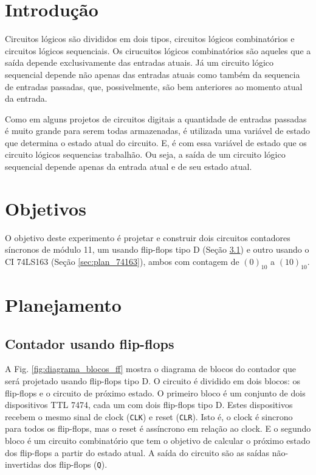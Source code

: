 \documentclass[a4,12pt]{horizon-theme}
\begin{document}
\horizonCover

\horizonTitle


\section{Introdução} %

Circuitos lógicos são divididos em dois tipos, circuitos lógicos combinatórios e circuitos lógicos sequenciais. Os cirucuitos lógicos combinatórios são aqueles que a saída depende exclusivamente das entradas atuais. Já um circuito lógico sequencial depende não apenas das entradas atuais como também da sequencia de entradas passadas, que, possivelmente, são bem anteriores ao momento atual da entrada.

Como em alguns projetos de circuitos digitais a quantidade de entradas passadas é muito grande para serem todas armazenadas, é utilizada uma variável de estado que determina o estado atual do circuito. E, é com essa variável de estado que os circuito lógicos sequencias trabalhão. Ou seja, a saída de um circuito lógico sequencial depende apenas da entrada atual e de seu estado atual.

\section{Objetivos} %
O objetivo deste experimento é projetar e construir dois circuitos contadores síncronos de módulo 11, um usando flip-flops tipo D (Seção \ref{sec:plan_ff}) e outro usando o CI 74LS163 (Seção \ref{sec:plan_74163}), ambos com contagem de $(0)_{10}$ a $(10)_{10}$.


\section{Planejamento} %
\label{sec:plan}

\subsection{Contador usando flip-flops}
\label{sec:plan_ff}

A Fig. \ref{fig:diagrama_blocos_ff} mostra o diagrama de blocos do contador que será projetado usando flip-flops tipo D. O circuito é dividido em dois blocos: os flip-flops e o circuito de próximo estado. O primeiro bloco é um conjunto de dois dispositivos TTL 7474, cada um com dois flip-flops tipo D. Estes dispositivos recebem o mesmo sinal de clock (\texttt{CLK}) e reset (\texttt{CLR}). Isto é, o clock é sincrono para todos os flip-flops, mas o reset é assíncrono em relação ao clock. E o segundo bloco é um circuito combinatório que tem o objetivo de calcular o próximo estado dos flip-flops a partir do estado atual. A saída do circuito são as saídas não-invertidas dos flip-flops (\texttt{Q}).
\end{document}
